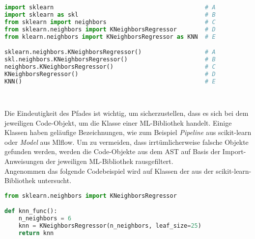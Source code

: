 \documentclass[german,bachelor]{swsLeipzig}
\begin{document}
\noindent\begin{minipage}{\linewidth}
\begin{lstlisting}[language=Python, frame=single, label=import,  basicstyle=\small, caption={Import- und Verwendungsmöglichkeiten der KNeighborsRegressor-Klasse aus scikit-learn},captionpos=b]
import sklearn                                           # A
import sklearn as skl                                    # B
from sklearn import neighbors                            # C
from sklearn.neighbors import KNeighborsRegressor        # D
from klearn.neighbors import KNeighborsRegressor as KNN  # E

sklearn.neighbors.KNeighborsRegressor()                  # A
skl.neighbors.KNeighborsRegressor()                      # B
neighbors.KNeighborsRegressor()                          # C
KNeighborsRegressor()                                    # D
KNN()                                                    # E
\end{lstlisting}
\end{minipage}
\

Die Eindeutigkeit des Pfades ist wichtig, um sicherzustellen, dass es sich bei dem jeweiligen Code-Objekt, um die Klasse
einer ML-Bibliothek handelt.
Einige Klassen haben geläufige Bezeichnungen, wie zum Beispiel \textit{Pipeline} aus scikit-learn oder \textit{Model} aus Mlflow.
Um zu vermeiden, dass irrtümlicherweise falsche Objekte gefunden werden, werden die Code-Objekte aus dem AST auf Basis der
Import-Anweisungen der jeweiligen ML-Bibliothek rausgefiltert.\\

Angenommen das folgende Codebeispiel wird auf Klassen der aus der scikit-learn-Bibliothek untersucht.\\

\noindent\begin{minipage}{\linewidth}
\begin{lstlisting}[language=Python, frame=single, label=knn,  basicstyle=\small, caption={Codebeispiel mit KNeighborsRegressor-Klasse},captionpos=b]
from sklearn.neighbors import KNeighborsRegressor

def knn_func():
    n_neighbors = 6
    knn = KNeighborsRegressor(n_neighbors, leaf_size=25)
    return knn
\end{lstlisting}
\end{minipage}
\
\end{document}
